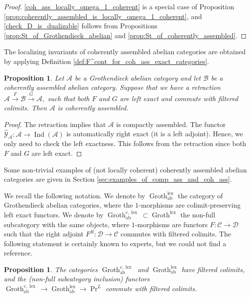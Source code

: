 \documentclass[11pt,leqno]{amsart}
\newtheorem{prop}[theo]{Proposition}
\numberwithin{equation}{section}
\newcommand{\xto}{\xrightarrow}
\newcommand{\lex}{\operatorname{lex}}
\newcommand{\Groth}{\operatorname{Groth}}
\newcommand{\cD}{{\mathcal D}}
\newcommand{\cA}{{\mathcal A}}
\newcommand{\cB}{{\mathcal B}}
\newcommand{\cC}{{\mathcal C}}
\newcommand{\cY}{{\mathcal Y}}
\newcommand{\ab}{\operatorname{ab}}
\newcommand{\Ind}{\operatorname{Ind}}
\begin{document}
\begin{proof}
\ref{coh_ass_locally_omega_1_coherent} is a special case of Proposition \ref{prop:coherently_assembled_is_locally_omega_1_coherent}, and \ref{check_D_is_dualizable} follows from Propositions \ref{prop:St_of_Grothendieck_abelian} and \ref{prop:St_of_coherently_assembled}.
\end{proof}

The localizing invariants of coherently assembled abelian categories are obtained by applying Definition \ref{def:F^cont_for_coh_ass_exact_categories}.

\begin{prop}\label{prop:coh_ass_ab_retraction_left_exact}
Let $\cA$ be a Grothendieck abelian category and let $\cB$ be a coherently assembled abelian category. Suppose that we have a retraction $\cA\xto{F}\cB\xto{G}\cA,$ such that both $F$ and $G$ are left exact and commute with filtered colimits. Then $\cA$ is coherently assembled.
\end{prop}

\begin{proof}
The retraction implies that $\cA$ is compactly assembled. The functor $\hat{\cY}_{\cA}:\cA\to\Ind(\cA)$ is automatically right exact (it is a left adjoint). Hence, we only need to check the left exactness. This follows from the retraction since both $F$ and $G$ are left exact.
\end{proof}

Some non-trivial examples of (not locally coherent) coherently assembled abelian categories are given in Section \ref{sec:examples_of_comp_ass_and_coh_ass}.

We recall the following notation. We denote by $\Groth^{\lex}_{\ab}$ the category of Grothendieck abelian categories, where the $1$-morphisms are colimit-preserving left exact functors. We denote by $\Groth^{c,\lex}_{\ab}\subset\Groth^{\lex}$ the non-full subcategory with the same objects, where $1$-morphisms are functors $F:\cC\to\cD$ such that the right adjoint $F^R:\cD\to\cC$ commutes with filtered colimits. The following statement is certainly known to experts, but we could not find a reference.

\begin{prop}
The categories $\Groth^{c,\lex}_{\ab}$ and $\Groth^{\lex}_{\ab}$ have filtered colimits, and the (non-full subcategory inclusion) functors $\Groth^{c,\lex}_{\ab}\to\Groth^{\lex}_{\ab}\to\Pr^L$ commute with filtered colimits. 
\end{prop}
\end{document}
